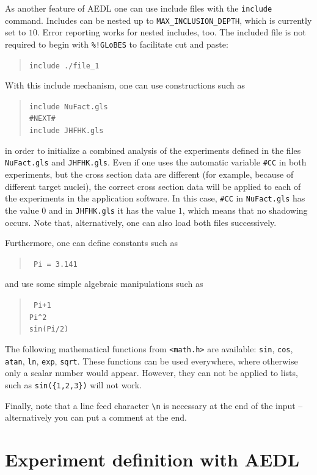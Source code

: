 As another feature of AEDL one can use include files with the {\tt include} command. Includes can be nested up to {\tt MAX\_INCLUSION\_DEPTH}, which is currently set to $10$. Error reporting works 
 for nested includes, too. The included file is not required to begin 
 with {\tt \%!GLoBES} to facilitate cut and paste:
\begin{quote}
{\tt include ./file\_1}
\end{quote}
With this include mechanism, one can use constructions such as 
\begin{quote}
{\tt    include NuFact.gls\\
        \#NEXT\#\\
        include JHFHK.gls
}
\end{quote}
in order to initialize a combined analysis of the experiments defined in the files {\tt NuFact.gls} and {\tt JHFHK.gls}. 
Even if one uses the
automatic variable {\tt \#CC} in both experiments, 
but the cross section data are different (for example, because of different target nuclei), the correct 
cross section data will be applied to each of the experiments in the 
application software. In this case, {\tt \#CC} in {\tt NuFact.gls} has 
the value $0$ and in {\tt JHFHK.gls} it has the value $1$, 
which means that no shadowing occurs. Note that, alternatively, one can 
also load both files successively. 

Furthermore, one can define constants such as
\begin{quote}
{\tt
Pi = 3.141
}
\end{quote}
and use some simple algebraic manipulations such as
\begin{quote}
{\tt
Pi+1\\
\verb+Pi^2+\\
sin(Pi/2)\\
}
\end{quote}
The following mathematical functions from {\tt <math.h>} are available: 
{\tt sin}, {\tt cos}, {\tt atan}, {\tt ln}, {\tt exp}, {\tt sqrt}. 
These functions can be used everywhere, where
otherwise only a scalar number would appear. However, they can not be
applied to lists, such as {\tt sin(\{1,2,3\})} will not work. 

Finally, note that a line feed character \verb+\n+ is necessary at
 the end of the input -- alternatively you can put a comment at the end.


\chapter{Experiment definition with AEDL}

